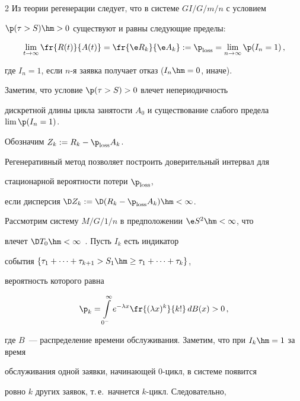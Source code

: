 \begin{multicols}{2}
  Из теории регенерации следует, что в системе $GI/G/m/n$ с условием


$\p(\tau>S)\hm>0$  существуют и равны следующие   пределы:


\begin{equation}


 \lim\limits_{t \to \infty}\fr{R(t)}{A(t)}= \fr{\e R_k}{\e


A_k}:=\p_{\mathrm{loss}}=\lim\limits_{n\to\infty}\p(I_n=1)\,,


\label{e4b-mn}


\end{equation}


где $I_n=1$, если $n$-я  заявка получает отказ ($I_n\hm=0$, иначе).


Заметим, что условие $\p(\tau>S)>0$  влечет непериодичность


дискретной длины цикла занятости $A_0$ и существование слабого предела $\lim \p(I_n=1)$.








Обозначим $ Z_k:= R_k-\p_{\mathrm{loss}}A_k$.


      Регенеративный метод позволяет построить  доверительный интервал для


 стационарной   вероятности потери    $\p_{\mathrm{loss}}$,


если дисперсия $\D Z_k:=\D (R_k-\p_{\mathrm{loss}}A_k)\hm<\infty$.





Рассмотрим систему $M/G/1/n$ в предположении $\e S^2\hm<\infty$, что


влечет   $\D T_0\hm<\infty$~\cite{Wolff}. Пусть $I_k$ есть индикатор


события $\{\tau_1+\cdots+\tau_{k+1}>S_1\hm\ge \tau_1+\cdots+\tau_k\}$,


вероятность которого равна 


$$ 


\p_k =\int\limits_{0^-}^\infty e^{-\lambda x}\fr{(\lambda x)^k}{k!} \,dB(x)>0\,, 


$$ 


где $B$~--- распределение времени обслуживания. Заметим, что при $I_k\hm=1$  за время


обслуживания одной заявки, начинающей 0-цикл, в системе появится


ровно $k$  других заявок, т.\,е.\ начнется $k$-цикл. Следовательно,  



\end{multicols}
